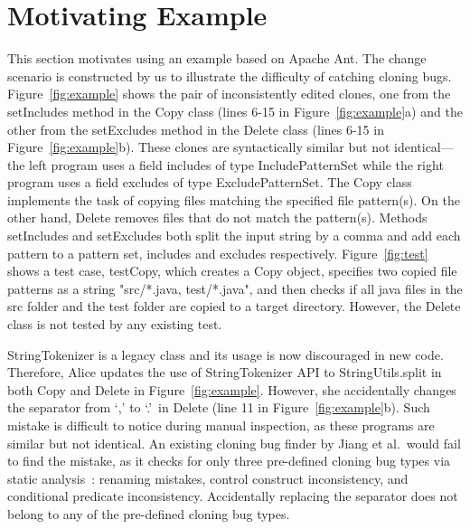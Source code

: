 \section{Motivating Example}
\label{sec:motivation}

This section motivates {\grafter} using an example based on Apache Ant. The change scenario is constructed by us to illustrate the difficulty of catching cloning bugs. Figure~\ref{fig:example} shows the pair of inconsistently edited clones, one from the {\ttt setIncludes} method in the {\ttt Copy} class (lines 6-15 in Figure~\ref{fig:example}a) and the other from the {\ttt setExcludes} method in the {\ttt Delete} class (lines 6-15 in Figure~\ref{fig:example}b). These clones are syntactically similar but not identical---the left program uses a field {\ttt includes} of type {\ttt IncludePatternSet} while the right program uses a field {\ttt excludes} of type {\ttt ExcludePatternSet}. The {\ttt Copy} class implements the task of copying files matching the specified file pattern(s). On the other hand, {\ttt Delete} removes files that do not match the pattern(s). Methods {\ttt setIncludes} and {\ttt setExcludes} both split the input string by a comma and add each pattern to a pattern set, {\ttt includes} and {\ttt excludes} respectively. Figure~\ref{fig:test} shows a test case, {\ttt testCopy}, which creates a {\ttt Copy} object, specifies two copied file patterns as a string {\ttt "src/*.java, test/*.java"}, and then checks if all java files in the {\ttt src} folder and the {\ttt test} folder are copied to a target directory. However, the {\ttt Delete} class is not tested by any existing test. 


{\ttt StringTokenizer} is a legacy class and its usage is now discouraged in new code. Therefore, Alice updates the use of {\ttt StringTokenizer} API to {\ttt StringUtils.split} in both {\ttt Copy} and {\ttt Delete} in Figure~\ref{fig:example}. However, she accidentally changes the separator from {\ttt `,'} to {\ttt `.'}~in {\ttt Delete} (line 11 in Figure~\ref{fig:example}b). Such mistake is difficult to notice during manual inspection, as these programs are similar but not identical. An existing cloning bug finder by Jiang et al.~would fail to find the mistake, as it checks for only three pre-defined cloning bug types via static analysis~\cite{Jiang2007}: renaming mistakes, control construct inconsistency, and conditional predicate inconsistency. Accidentally replacing the separator does not belong to any of the pre-defined cloning bug types.

